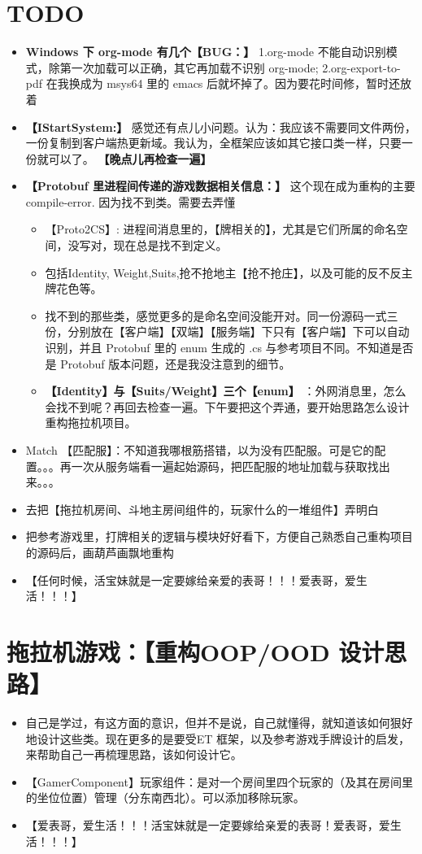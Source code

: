 \documentclass[9pt, b5paper]{article}
\begin{document}
\section{{\bfseries\sffamily TODO} }
\label{sec:orgfc73169}
\begin{itemize}
\item \textbf{Windows 下 org-mode 有几个【BUG：】} 1.org-mode 不能自动识别模式，除第一次加载可以正确，其它再加载不识别 org-mode; 2.org-export-to-pdf 在我换成为 msys64 里的 emacs 后就坏掉了。因为要花时间修，暂时还放着
\item \textbf{【IStartSystem:】} 感觉还有点儿小问题。认为：我应该不需要同文件两份，一份复制到客户端热更新域。我认为，全框架应该如其它接口类一样，只要一份就可以了。 \textbf{【晚点儿再检查一遍】}
\item \textbf{【Protobuf 里进程间传递的游戏数据相关信息：】} 这个现在成为重构的主要 compile-error. 因为找不到类。需要去弄懂
\begin{itemize}
\item 【Proto2CS】: 进程间消息里的，【牌相关的】，尤其是它们所属的命名空间，没写对，现在总是找不到定义。
\item 包括Identity, Weight,Suits,抢不抢地主【抢不抢庄】，以及可能的反不反主牌花色等。
\item 找不到的那些类，感觉更多的是命名空间没能开对。同一份源码一式三份，分别放在【客户端】【双端】【服务端】下只有【客户端】下可以自动识别，并且 Protobuf 里的 enum 生成的 .cs 与参考项目不同。不知道是否是 Protobuf 版本问题，还是我没注意到的细节。
\item \textbf{【Identity】与【Suits/Weight】三个【enum】} ：外网消息里，怎么会找不到呢？再回去检查一遍。下午要把这个弄通，要开始思路怎么设计重构拖拉机项目。
\end{itemize}
\item Match 【匹配服】：不知道我哪根筋搭错，以为没有匹配服。可是它的配置。。。再一次从服务端看一遍起始源码，把匹配服的地址加载与获取找出来。。。
\item 去把【拖拉机房间、斗地主房间组件的，玩家什么的一堆组件】弄明白
\item 把参考游戏里，打牌相关的逻辑与模块好好看下，方便自己熟悉自己重构项目的源码后，画葫芦画飘地重构
\item 【任何时候，活宝妹就是一定要嫁给亲爱的表哥！！！爱表哥，爱生活！！！】
\end{itemize}

\section{拖拉机游戏：【重构OOP/OOD 设计思路】}
\label{sec:org70d8996}
\begin{itemize}
\item 自己是学过，有这方面的意识，但并不是说，自己就懂得，就知道该如何狠好地设计这些类。现在更多的是要受ET 框架，以及参考游戏手牌设计的启发，来帮助自己一再梳理思路，该如何设计它。
\item 【GamerComponent】玩家组件：是对一个房间里四个玩家的（及其在房间里的坐位位置）管理（分东南西北）。可以添加移除玩家。
\item 【爱表哥，爱生活！！！活宝妹就是一定要嫁给亲爱的表哥！爱表哥，爱生活！！！】
\end{itemize}
\end{document}
